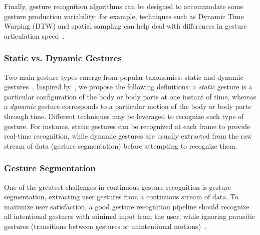 Finally, gesture recognition algorithms can be designed to accommodate some gesture production variability: for example, techniques such as Dynamic Time Warping (DTW) and spatial sampling can help deal with differences in gesture articulation speed~\cite{Taranta:2017, Vatavu:2013}.


\subsubsection{Static vs. Dynamic Gestures} \label{sec:state_of_the_art:overview:challenges:static-vs-dynamic}
Two main gesture types emerge from popular taxonomies: static and dynamic gestures~\cite{Aigner:2012,Vatavu:2008,Piumsomboon:2013,Choi:2014}. Inspired by~\cite{Vatavu:2008}, we propose the following definitions: a \textit{static} gesture is a particular configuration of the body or body parts at one instant of time, whereas a \textit{dynamic} gesture corresponds to a particular motion of the body or body parts through time. 
Different techniques may be leveraged to recognize each type of gesture. For instance, static gestures can be recognized at each frame to provide real-time recognition, while dynamic gestures are usually extracted from the raw stream of data (\ie gesture segmentation) before attempting to recognize them.


\subsubsection{Gesture Segmentation} \label{sec:state_of_the_art:overview:challenges:segmentation}
One of the greatest challenges in continuous gesture recognition is gesture segmentation, \ie extracting user gestures from a continuous stream of data. To maximize user satisfaction, a good gesture recognition pipeline should recognize all intentional gestures with minimal input from the user, while ignoring parasitic gestures (\eg transitions between gestures or unintentional motions)~\cite{Ashbrook:2010}. 

